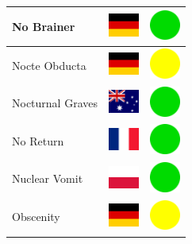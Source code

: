 \documentclass[12pt, a4paper, twoside]{report}
\begin{document}
\begin{center}
\begin{longtable}{|p{5cm}|p{2cm}|p{2cm}|}
No Brainer & \includegraphics[width=1cm]{4x3/de} & \includegraphics[width=1cm]{likes/y} \\ \hline
Nocte Obducta & \includegraphics[width=1cm]{4x3/de} & \includegraphics[width=1cm]{likes/m} \\ \hline
Nocturnal Graves & \includegraphics[width=1cm]{4x3/au} & \includegraphics[width=1cm]{likes/y} \\ \hline
No Return & \includegraphics[width=1cm]{4x3/fr} & \includegraphics[width=1cm]{likes/y} \\ \hline
Nuclear Vomit & \includegraphics[width=1cm]{4x3/pl} & \includegraphics[width=1cm]{likes/y} \\ \hline
Obscenity & \includegraphics[width=1cm]{4x3/de} & \includegraphics[width=1cm]{likes/m} \\ \hline

\end{longtable}
\end{center}
\end{document}
